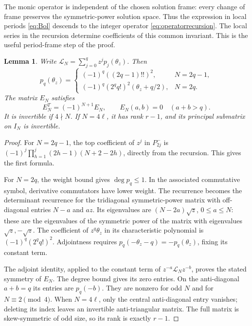 \documentclass[11pt]{article}
\newtheorem{lemma}[theorem]{Lemma}
\theoremstyle{definition}
\numberwithin{equation}{section}
\begin{document}
The monic operator is independent of the chosen solution frame:
every change of frame preserves the symmetric-power solution space.
Thus the expression in local periods \eqref{eq:Bol} descends to the
integer operator \eqref{eq:operatorrecursion}.
The local series in the recursion determine coefficients of this
common invariant. This is the useful period-frame step of the proof.

\begin{lemma}\label{lem:leading}
Write $\mathcal L_N=\sum_{j=0}^qz^jp_j(\theta_z)$. Then
\begin{equation}\label{eq:leading}
 p_q(\theta_z)=
 \begin{cases}
 (-1)^q((2q-1)!!)^2,&N=2q-1,\\
 (-1)^q(2^qq!)^2(\theta_z+q/2),&N=2q.
 \end{cases}
\end{equation}
The matrix $E_N$ satisfies
\[
 E_N^T=(-1)^{N+1}E_N,\qquad E_N(a,b)=0\quad(a+b>q).
\]
It is invertible if $4\nmid N$. If $N=4\ell$, it has rank $r-1$,
and its principal submatrix on $I_N$ is invertible.
\end{lemma}
\begin{proof}
For $N=2q-1$, the top coefficient of $z^j$ in $P^-_{2j}$ is
$(-1)^j\prod_{h=1}^j(2h-1)(N+2-2h)$, directly from the recursion.
This gives the first formula.

For $N=2q$, the weight bound gives $\deg p_q\le1$.
In the associated commutative symbol, derivative commutators have
lower weight. The recurrence becomes the determinant recurrence for
the tridiagonal symmetric-power matrix with off-diagonal entries
$N-a$ and $az$. Its eigenvalues are $(N-2a)\sqrt z$,
$0\le a\le N$: these are the eigenvalues of the symmetric power of
the matrix with eigenvalues $\sqrt z,-\sqrt z$.
The coefficient of $z^q\theta_z$ in its characteristic polynomial is
$(-1)^q(2^qq!)^2$. Adjointness requires
$p_q(-\theta_z-q)=-p_q(\theta_z)$, fixing its constant term.

The adjoint identity, applied to the constant term of
$z^{-a}\mathcal L_Nz^{-b}$, proves the stated symmetry of $E_N$.
The degree bound gives its zero entries. On the anti-diagonal
$a+b=q$ its entries are $p_q(-b)$.
They are nonzero for odd $N$ and for $N\equiv2\pmod4$.
When $N=4\ell$, only the central anti-diagonal entry vanishes;
deleting its index leaves an invertible anti-triangular matrix.
The full matrix is skew-symmetric of odd size, so its rank is
exactly $r-1$.
\end{proof}
\end{document}

